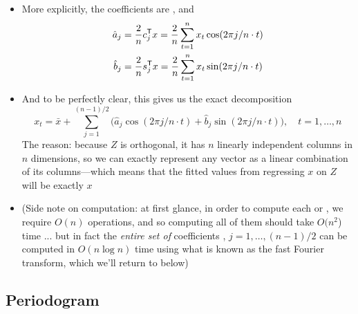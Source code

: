 \documentclass{article}
\begin{document}
\begin{itemize}
\item More explicitly, the coefficients are , and   
  \begin{equation}
  \label{eq:fourier_coef}
  \begin{aligned}
  \hat{a}_j &= \frac{2}{n} c_j^{\mathsf{T}} x = \frac{2}{n} \sum_{t=1}^n x_t \cos(2\pi j/n
  \cdot t) \\
  \hat{b}_j &= \frac{2}{n} s_j^{\mathsf{T}} x = \frac{2}{n} \sum_{t=1}^n x_t \sin(2\pi j/n
  \cdot t) 
  \end{aligned}
  \end{equation}

\item And to be perfectly clear, this gives us the exact decomposition 
  \begin{equation}
  \label{eq:fourier_decomp}
  x_t = \bar{x} + \sum_{j=1}^{(n-1)/2} \Big( \hat{a}_j \cos(2\pi j/n \cdot t) + 
  \hat{b}_j \sin(2\pi j/n \cdot t) \Big), \quad t = 1,\dots,n 
  \end{equation}
  The reason: because $Z$ is orthogonal, it has $n$ linearly independent
  columns in $n$ dimensions, so we can exactly represent any vector as a linear
  combination of its columns---which means that the fitted values from
  regressing $x$ on $Z$ will be exactly $x$  

\item (Side note on computation: at first glance, in order to compute each
   or , we require $O(n)$ operations, and 
  so computing all of them should take $O(n^2$) time ... but in fact the
  \emph{entire set of} coefficients , $j =
  1,\dots,(n-1)/2$ can be computed in $O(n \log{n})$ time using what is known as
  the fast Fourier transform, which we'll return to below)
\end{itemize}

\subsection{Periodogram}
\end{document}
